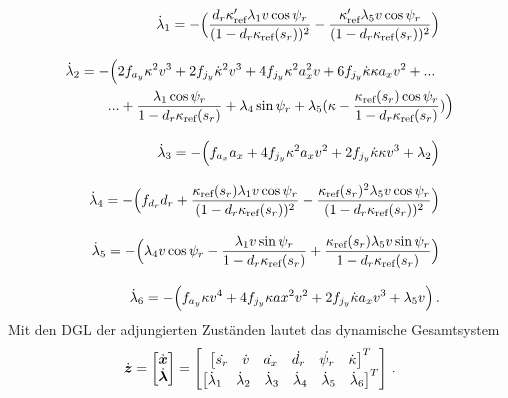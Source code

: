 \begin{align}
	\begin{split}
		\dot{\lambda}_1 &= -\Big(\frac{d_r\kappa'_{\textrm{ref}}\lambda_1v\cos{\psi_r}}{(1-d_r\kappa_{\textrm{ref}}(s_r))^2} - \frac{\kappa'_{\textrm{ref}}\lambda_5v\cos{\psi_r}}{(1-d_r\kappa_{\textrm{ref}}(s_r))^2}\Big)
	\end{split} \label{eq:dlambda1}
	\\[2ex]
	\begin{split}
		\dot{\lambda}_2 &= -\Big(2f_{a_y} \kappa^2v^3 + 2f_{j_y}\dot{\kappa}^2v^3 + 4f_{j_y}\kappa^2a_x^2v + 6f_{j_y}\dot{\kappa}\kappa a_xv^2 + ...\\
		&\qquad ... + \frac{\lambda_1\cos{\psi_r}}{1-d_r\kappa_{\textrm{ref}}(s_r)} + \lambda_4\sin{\psi_r} + \lambda_5(\kappa - \frac{\kappa_{\textrm{ref}}(s_r) \cos{\psi_r}}{1-d_r\kappa_{\textrm{ref}}(s_r)})\Big)
	\end{split} \label{eq:dlambda2}
	\\[2ex]
	\begin{split}
		\dot{\lambda}_3 &= -\Big(f_{a_x} a_x + 4f_{j_y}\kappa^2a_xv^2 + 2f_{j_y}\dot{\kappa}\kappa v^3 + \lambda_2 \Big)
	\end{split} \label{eq:dlambda3}
	\\[2ex]
	\begin{split}
		\dot{\lambda}_4 &= -\Big(f_{d_r} d_r + \frac{\kappa_{\textrm{ref}}(s_r)\lambda_1v\cos{\psi_r}}{(1-d_r\kappa_{\textrm{ref}}(s_r))^2} -\frac{\kappa_{\textrm{ref}}(s_r)^2\lambda_5v\cos{\psi_r}}{(1-d_r\kappa_{\textrm{ref}}(s_r))^2} \Big)
	\end{split} \label{eq:dlambda4}
	\\[2ex]
	\begin{split}
		\dot{\lambda}_5 &= -\Big(\lambda_4v\cos{\psi_r} - \frac{\lambda_1v\sin{\psi_r}}{1-d_r\kappa_{\textrm{ref}}(s_r)} + \frac{\kappa_{\textrm{ref}}(s_r)\lambda_5v\sin{\psi_r}}{1-d_r\kappa_{\textrm{ref}}(s_r)}\Big)
	\end{split} \label{eq:dlambda5}
	\\[2ex]
	\begin{split}
		\dot{\lambda}_6 &= -\Big(f_{a_y}\kappa v^4 + 4f_{j_y}\kappa ax^2v^2 + 2f_{j_y} \dot{\kappa}a_xv^3 + \lambda_5v \Big)\,.
	\end{split} \label{eq:dlambda6}
\end{align}
Mit den \gls{DGL} der adjungierten Zuständen lautet das dynamische Gesamtsystem
\begin{equation}
	\dot{\boldsymbol{z}} = \begin{bmatrix}
	\dot{\boldsymbol{x}} \\
	\dot{\boldsymbol{\lambda}}
	\end{bmatrix} =
	\begin{bmatrix}
		\begin{bmatrix}
		\dot{s_r} & \dot{v} & \dot{a_x} & \dot{d_r} & \dot{\psi_r} & \dot{\kappa}
		\end{bmatrix}^T\\
		\begin{bmatrix}
		\dot{\lambda}_1 & \dot{\lambda}_2 & \dot{\lambda}_3 & \dot{\lambda}_4 & \dot{\lambda}_5 & \dot{\lambda}_6
		\end{bmatrix}^T
	\end{bmatrix}\,.
\end{equation}
